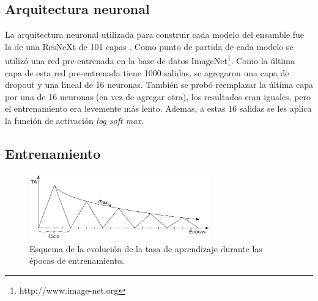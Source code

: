 \documentclass[a4article]{article}
\begin{document}
\subsection{Arquitectura neuronal}
La arquitectura neuronal utilizada para construir cada modelo del ensamble fue la de una ResNeXt de 101 capas
\citep{xie2017aggregated}. Como punto de partida de cada modelo se utilizó una red pre-entrenada en la base de datos
ImageNet\footnote{http://www.image-net.org}. Como la última capa de esta red pre-entrenada tiene 1000 salidas, se
agregaron una capa de dropout y una lineal de 16 neuronas. También se probó reemplazar la última capa por una de 16
neuronas (en vez de agregar otra), los resultados eran iguales, pero el entrenamiento era levemente más lento. Ademas, a
estas 16 salidas se les aplica la función de activación \textit{log soft max}.

\subsection{Entrenamiento}

\begin{figure}[tp]
	\centering
	\includegraphics[width=0.7\textwidth]{./CLR.pdf}
	\caption{Esquema de la evolución de la tasa de aprendizaje durante las épocas de entrenamiento.}
	\label{fig:clr}
\end{figure}
\end{document}
